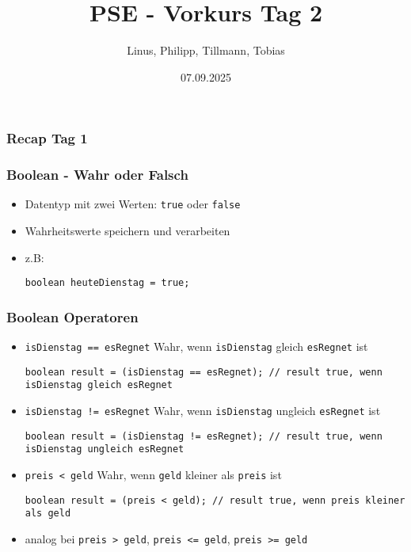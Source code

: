 \documentclass{../../presentation}
\title{PSE - Vorkurs Tag 2}
\author{Linus, Philipp, Tillmann, Tobias}
\institute{FIUS - Fachgruppe Informatik Universität Stuttgart}
\date{07.09.2025}
\begin{document}
\begin{frame}
  \titlepage
\end{frame}

\begin{frame}
  \listoftodos
\end{frame}

\begin{frame}
  \frametitle{Recap Tag 1}
\end{frame}



\begin{frame}[fragile]
  \frametitle{Boolean - Wahr oder Falsch}
  \begin{itemize}
    \item Datentyp mit zwei Werten: \texttt{true} oder \texttt{false}
    \item Wahrheitswerte speichern und verarbeiten

    \item z.B:
          \begin{verbatim}
boolean heuteDienstag = true;
    \end{verbatim}

  \end{itemize}
\end{frame}



\begin{frame}[fragile]
  \frametitle{Boolean Operatoren}


  \begin{itemize}
    \item<1->\texttt{isDienstag == esRegnet} \quad Wahr, wenn \texttt{isDienstag} gleich \texttt{esRegnet} ist
          \begin{verbatim}
boolean result = (isDienstag == esRegnet); // result true, wenn isDienstag gleich esRegnet
    \end{verbatim}

    \item<2->\texttt{isDienstag != esRegnet} \quad Wahr, wenn \texttt{isDienstag} ungleich \texttt{esRegnet} ist
          \begin{verbatim}
boolean result = (isDienstag != esRegnet); // result true, wenn isDienstag ungleich esRegnet
    \end{verbatim}

    \item<3->\texttt{preis < geld} \quad Wahr, wenn \texttt{geld} kleiner als \texttt{preis} ist
          \begin{verbatim}
boolean result = (preis < geld); // result true, wenn preis kleiner als geld
    \end{verbatim}

    \item<4->analog bei \texttt{preis > geld}, \texttt{preis <= geld}, \texttt{preis >= geld} \quad
  \end{itemize}
\end{frame}
\end{document}
